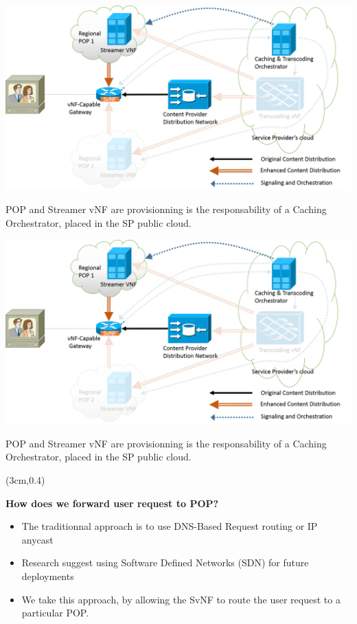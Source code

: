 \documentclass[a4paper]{beamer}
\begin{document}
\begin{frame}[plain,T]{}
	\centering
	\includegraphics[width=0.95\linewidth]{highleveldesign3.png}
	\vspace{2em}
	\begin{block}{}
		POP and Streamer vNF are provisionning is the responsability of a Caching Orchestrator, placed in the SP public cloud.
	\end{block}
\end{frame}

\begin{frame}[plain,T]{}
	\centering
	\includegraphics[width=0.95\linewidth]{highleveldesign3.png}
	\vspace{2em}
	\begin{block}{}
		POP and Streamer vNF are provisionning is the responsability of a Caching Orchestrator, placed in the SP public cloud.
	\end{block}
		\begin{textblock*}{8cm}(3cm,0.4\textheight)
		\begin{alertblock}{}
			\textbf{ How does we forward user request to POP? }
			\begin{itemize}
				\item The traditionnal approach is to use DNS-Based Request routing or IP anycast
				\item Research suggest using Software Defined Networks (SDN) for future deployments
				\item We take this approach, by allowing the SvNF to route the user request to a particular POP.
			\end{itemize}
		\end{alertblock}
	\end{textblock*}		
\end{frame}
\end{document}
